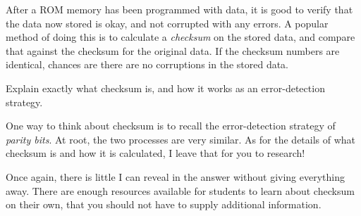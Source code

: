 

After a ROM memory has been programmed with data, it is good to verify that the data now stored is okay, and not corrupted with any errors.  A popular method of doing this is to calculate a {\it checksum} on the stored data, and compare that against the checksum for the original data.  If the checksum numbers are identical, chances are there are no corruptions in the stored data.

Explain exactly what checksum is, and how it works as an error-detection strategy.







One way to think about checksum is to recall the error-detection strategy of {\it parity bits}.  At root, the two processes are very similar.  As for the details of what checksum is and how it is calculated, I leave that for you to research!







Once again, there is little I can reveal in the answer without giving everything away.  There are enough resources available for students to learn about checksum on their own, that you should not have to supply additional information.





